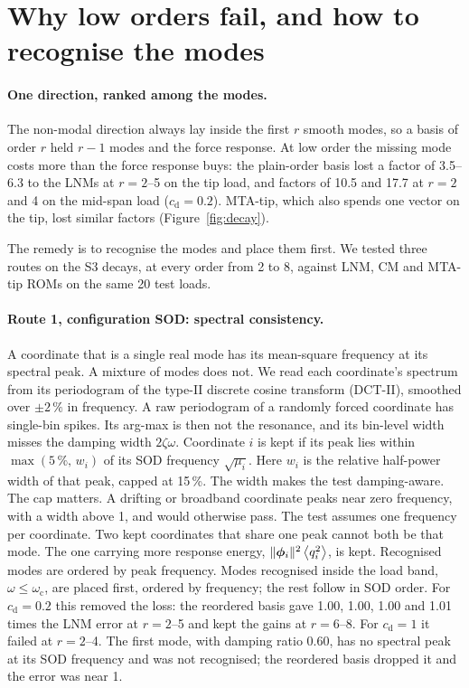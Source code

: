 \documentclass[preprint,12pt]{elsarticle}
\begin{document}
\section{Why low orders fail, and how to recognise the modes}\label{sec:order}
\paragraph{One direction, ranked among the modes.} The non-modal direction always lay inside the first $r$ smooth modes, so a basis of order $r$ held $r-1$ modes and the force response. At low order the missing mode costs more than the force response buys: the plain-order basis lost a factor of 3.5--6.3 to the LNMs at $r=2$--5 on the tip load, and factors of 10.5 and 17.7 at $r=2$ and 4 on the mid-span load ($c_{\mathrm d}=0.2$). MTA-tip, which also spends one vector on the tip, lost similar factors (Figure~\ref{fig:decay}).

The remedy is to recognise the modes and place them first. We tested three routes on the S3 decays, at every order from 2 to 8, against LNM, CM and MTA-tip ROMs on the same 20 test loads.


\paragraph{Route 1, configuration SOD: spectral consistency.} A coordinate that is a single real mode has its mean-square frequency at its spectral peak. A mixture of modes does not. We read each coordinate's spectrum from its periodogram of the type-II discrete cosine transform (DCT-II), smoothed over $\pm2\,\%$ in frequency. A raw periodogram of a randomly forced coordinate has single-bin spikes. Its arg-max is then not the resonance, and its bin-level width misses the damping width $2\zeta\omega$. Coordinate $i$ is kept if its peak lies within $\max(5\,\%,\,w_i)$ of its SOD frequency $\sqrt{\mu_i}$. Here $w_i$ is the relative half-power width of that peak, capped at 15\,\%. The width makes the test damping-aware. The cap matters. A drifting or broadband coordinate peaks near zero frequency, with a width above 1, and would otherwise pass. The test assumes one frequency per coordinate. Two kept coordinates that share one peak cannot both be that mode. The one carrying more response energy, $\|\bm{\phi}_i\|^2\left\langle q_i^2 \right\rangle$, is kept. Recognised modes are ordered by peak frequency.
Modes recognised inside the load band, $\omega\le\omega_{\mathrm c}$, are placed first, ordered by frequency; the rest follow in SOD order.
For $c_{\mathrm d}=0.2$ this removed the loss: the reordered basis gave 1.00, 1.00, 1.00 and 1.01 times the LNM error at $r=2$--5 and kept the gains at $r=6$--8. For $c_{\mathrm d}=1$ it failed at $r=2$--4. The first mode, with damping ratio 0.60, has no spectral peak at its SOD frequency and was not recognised; the reordered basis dropped it and the error was near 1.
\end{document}
